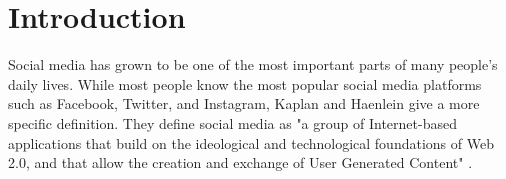 \chapter{Introduction}
\label{cha:Chapter1_Introduction}

\iffalse

Total length: up to 5 Months = ~20 weeks oder
\selectlanguage{german}{

Abstract fertig machen, konkreter werden --> vor allem Methoden, kleiner Ansatz


Length: 1-2 pages
Inhaltsverzeichnis --> auch mehr Punkte

Methodology and Implementation --> kann man auch anders aufteilen
Motivation, Hintergrund

Warum diese Plattform --> einfache API

Auch aufpassen illegal

Wann schreiben? --> am Anfang, am Ende? Erstmal Entwurf am Ende
}
\selectlanguage{english}
%
%

\fi

Social media has grown to be one of the most important parts of many people's daily lives. While most people know the most popular social media platforms such as Facebook, Twitter, and Instagram, Kaplan and Haenlein give a more specific definition. They define social media as "a group of Internet-based applications that build on the ideological and technological foundations of Web 2.0, and that allow the creation and exchange of User Generated Content" \cite[p.~61]{KAPLAN201059}. 

